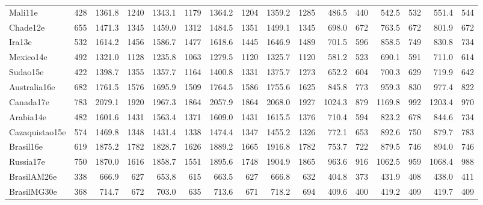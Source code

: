 \begin{landscape}
\begin{table}[htb]
{\begin{tabular}{@{}lr|rr|rr|rr|rr|rr|rr|rr@{}}
Mali11e&428&1361.8&1240&1343.1&1179&1364.2&1204&1359.2&1285&486.5&440&542.5&532&551.4&544\\
Chade12e&655&1471.3&1345&1459.0&1312&1484.5&1351&1499.1&1345&698.0&672&763.5&672&801.9&672\\
Ira13e&532&1614.2&1456&1586.7&1477&1618.6&1445&1646.9&1489&701.5&596&858.5&749&830.8&734\\
Mexico14e&492&1321.0&1128&1235.8&1063&1279.5&1120&1325.7&1120&581.2&523&690.1&591&711.0&614\\
Sudao15e&422&1398.7&1355&1357.7&1164&1400.8&1331&1375.7&1273&652.2&604&700.3&629&719.9&642\\
Australia16e&682&1761.5&1576&1695.9&1509&1764.5&1586&1755.6&1625&845.8&773&959.3&830&977.4&822\\
Canada17e&783&2079.1&1920&1967.3&1864&2057.9&1864&2068.0&1927&1024.3&879&1169.8&992&1203.4&970\\
Arabia14e&482&1601.6&1431&1563.4&1371&1609.0&1431&1615.5&1376&710.4&594&823.2&678&844.6&734\\
Cazaquistao15e&574&1469.8&1348&1431.4&1338&1474.4&1347&1455.2&1326&772.1&653&892.6&750&879.7&783\\
Brasil16e&619&1875.2&1782&1828.7&1626&1889.2&1665&1916.8&1782&753.7&722&879.5&746&894.0&746\\
Russia17e&750&1870.0&1616&1858.7&1551&1895.6&1748&1904.9&1865&963.6&916&1062.5&959&1068.4&988\\
BrasilAM26e&338&666.9&627&653.8&615&663.5&627&666.8&632&404.8&373&431.9&408&438.0&411\\
BrasilMG30e&368&714.7&672&703.0&635&713.6&671&718.2&694&409.6&400&419.2&409&419.7&409\\
\bottomrule
\end{tabular}
}
\end{table}
\end{landscape}
